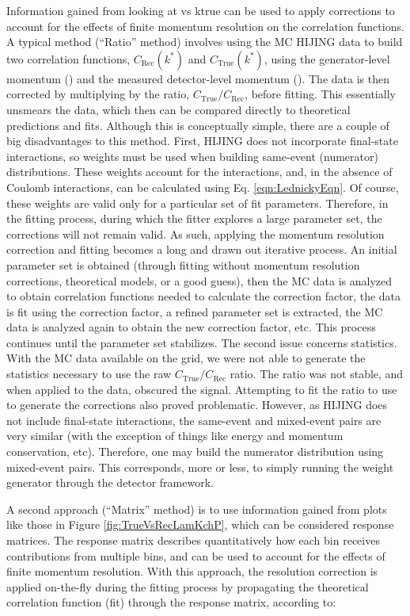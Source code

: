\documentclass[/home/jesse/Analysis/FemtoAnalysis/AnalysisNotes/AnalysisNoteJBuxton.tex]{subfiles}
\begin{document}
Information gained from looking at \krec vs ktrue can be used to apply corrections to account for the effects of finite momentum resolution on the correlation functions.
A typical method (``Ratio'' method) involves using the MC HIJING data to build two correlation functions, $C_{\mathrm{Rec}}(k^{*})$ and $C_{\mathrm{True}}(k^{*})$, using the generator-level momentum (\ktrue) and the measured detector-level momentum (\krec).
The data is then corrected by multiplying by the ratio, $C_{\mathrm{True}}/C_{\mathrm{Rec}}$, before fitting.
This essentially unsmears the data, which then can be compared directly to theoretical predictions and fits.
Although this is conceptually simple, there are a couple of big disadvantages to this method.
First, HIJING does not incorporate final-state interactions, so weights must be used when building same-event (numerator) distributions.
These weights account for the interactions, and, in the absence of Coulomb interactions, can be calculated using Eq. \ref{eqn:LednickyEqn}.
Of course, these weights are valid only for a particular set of fit parameters.
Therefore, in the fitting process, during which the fitter explores a large parameter set, the corrections will not remain valid.
As such, applying the momentum resolution correction and fitting becomes a long and drawn out iterative process.
An initial parameter set is obtained (through fitting without momentum resolution corrections, theoretical models, or a good guess), then the MC data is analyzed to obtain correlation functions needed to calculate the correction factor, the data is fit using the correction factor, a refined parameter set is extracted, the MC data is analyzed again to obtain the new correction factor, etc.
This process continues until the parameter set stabilizes.
The second issue concerns statistics.
With the MC data available on the grid, we were not able to generate the statistics necessary to use the raw $C_{\mathrm{True}}/C_{\mathrm{Rec}}$ ratio.
The ratio was not stable, and when applied to the data, obscured the signal.
Attempting to fit the ratio to use to generate the corrections also proved problematic.
However, as HIJING does not include final-state interactions, the same-event and mixed-event pairs are very similar (with the exception of things like energy and momentum conservation, etc).
Therefore, one may build the numerator distribution using mixed-event pairs.
This corresponds, more or less, to simply running the weight generator through the detector framework.

A second approach (``Matrix'' method) is to use information gained from plots like those in Figure \ref{fig:TrueVsRecLamKchP}, which can be considered response matrices.
The response matrix describes quantitatively how each \krec bin receives contributions from multiple \ktrue bins, and can be used to account for the effects of finite momentum resolution.
With this approach, the resolution correction is applied on-the-fly during the fitting process by propagating the theoretical correlation function (fit) through the response matrix, according to:  
\end{document}
